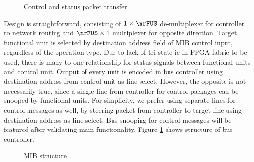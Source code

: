 	\begin{figure}[!hbp]
	\centering
	\hfill
	
	\caption{Control and status packet transfer}
	\end{figure}
	
		Design is straightforward, consisting of $1\times\nrFUS$ de-multiplexer for controller to network routing and $\nrFUS\times 1$ multiplexer for opposite direction. Target functional unit is selected by destination address field of MIB control input, regardless of the operation type.  Due to lack of tri-state ic in FPGA fabric to be used, there is many-to-one relationship for status signals between functional units and control unit. Output of every unit is encoded in bus controller using destination address from control unit as line select. However, the opposite is not necessarily true, since a single line from controller for control packages can be snooped by functional units. For simplicity, we prefer using separate lines for control messages as well, by steering packet from controller to target line using destination address as line select. Bus snooping for control messages will be featured after validating main functionality. Figure \ref{fig:mib} shows structure of bus controller.
	\begin{figure}[htbp]
		\centering
		\def\svgscale{0.50}
		
		\caption{MIB structure}
		\label{fig:mib} 
	\end{figure}
